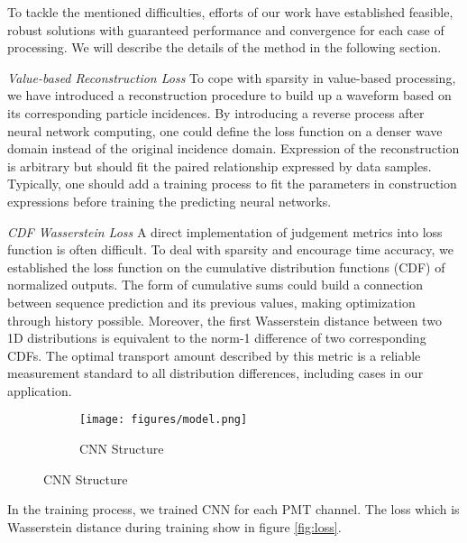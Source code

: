 To tackle the mentioned difficulties, efforts of our work have established feasible, robust solutions with guaranteed performance and convergence for each case of processing. We will describe the details of the method in the following section.

\emph{Value-based Reconstruction Loss}
To cope with sparsity in value-based processing, we have introduced a reconstruction procedure to build up a waveform based on its corresponding particle incidences. By introducing a reverse process after neural network computing, one could define the loss function on a denser wave domain instead of the original incidence domain. Expression of the reconstruction is arbitrary but should fit the paired relationship expressed by data samples. Typically, one should add a training process to fit the parameters in construction expressions before training the predicting neural networks.

\emph{CDF Wasserstein Loss}
A direct implementation of judgement metrics into loss function is often difficult. To deal with sparsity and encourage time accuracy, we established the loss function on the cumulative distribution functions (CDF) of normalized outputs. The form of cumulative sums could build a connection between sequence prediction and its previous values, making optimization through history possible. Moreover, the first Wasserstein distance between two 1D distributions is equivalent to the norm-1 difference of two corresponding CDFs. The optimal transport amount described by this metric is a reliable measurement standard to all distribution differences, including cases in our application.

\begin{figure}[H]
\begin{minipage}{.3\textwidth}
\begin{figure}[H]
    \centering
    \texttt{[image: figures/model.png]}
    \caption{\label{fig:struct} CNN Structure}
\end{figure}
\end{minipage}
\hspace{4mm}
\begin{minipage}{.7\textwidth}

\end{minipage}
\end{figure}

In the training process, we trained CNN for each PMT channel. The loss which is Wasserstein distance during training show in figure \ref{fig:loss}. 

